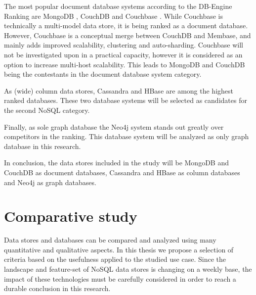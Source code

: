 The most popular document database systems according to the DB-Engine Ranking are MongoDB \autocite{MongoDB2009}, CouchDB \autocite{CouchDB2005} and Couchbase \autocite{Couchbase2010}. While Couchbase is technically a multi-model data store, it is being ranked as a document database. However, Couchbase is a conceptual merge between CouchDB and Membase, and mainly adds improved scalability, clustering and auto-sharding. Couchbase will not be investigated upon in a practical capacity, however it is considered as an option to increase multi-host scalability. This leads to MongoDB and CouchDB being the contestants in the document database system category.

As (wide) column data stores, Cassandra \autocite{Cassandra2008} and HBase \autocite{HBase2005} are among the highest ranked databases. These two database systems will be selected as candidates for the second NoSQL category.

Finally, as sole graph database the Neo4j system \autocite{Neo4j2007} stands out greatly over competitors in the ranking. This database system will be analyzed as only graph database in this research.

In conclusion, the data stores included in the study will be MongoDB and CouchDB as document databases, Cassandra and HBase as column databases and Neo4j as graph databases.

\section{Comparative study}
\label{sec:comparative study}

Data stores and databases can be compared and analyzed using many quantitative and qualitative aspects. In this thesis we propose a selection of criteria based on the usefulness applied to the studied use case. Since the landscape and feature-set of NoSQL data stores is changing on a weekly base, the impact of these technologies must be carefully considered in order to reach a durable conclusion in this research.

